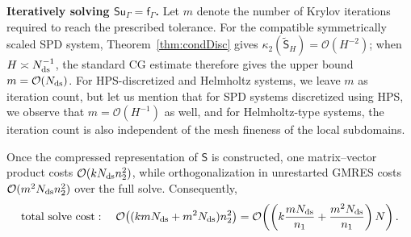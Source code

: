 \documentclass[final,onefignum,onetabnum]{siamart250211}
\newcommand{\vct}[1]{\bm{\mathsf{#1}}}
\newcommand{\mtx}[1]{\bm{\mathsf{#1}}}
\theoremstyle{definition}
\begin{document}
\noindent \textbf{Iteratively solving $\mtx{S}\vct{u}_{\Gamma} = \vct{f}_{\Gamma}$.}
Let $m$ denote the number of Krylov iterations required to reach the prescribed tolerance. For the compatible symmetrically scaled SPD system, Theorem~\ref{thm:condDisc} gives $\kappa_2(\widetilde{\mtx{S}}_H)=\mathcal O(H^{-2})$; when $H\asymp N_{\rm ds}^{-1}$, the standard CG estimate therefore gives the upper bound $m=\mathcal O(N_{\rm ds})$. For HPS-discretized and Helmholtz systems, we leave $m$ as iteration count, but let us mention that for SPD systems discretized using HPS, we observe that $m=\mathcal{O}(H^{-1})$ as well, and for Helmholtz-type systems, the iteration count is also independent of the mesh fineness of the local subdomains.


Once the compressed representation of $\mtx S$ is constructed, one matrix--vector product costs $\mathcal O(kN_{\rm ds}n_2^2)$, while orthogonalization in unrestarted GMRES costs $\mathcal O(m^2N_{\rm ds}n_2^2)$ over the full solve. Consequently,
\[
\text{total solve cost}:\quad
\mathcal O\!\left((k mN_{\rm ds}+m^2N_{\rm ds})n_2^2\right)
=
\mathcal O\!\left(\left(k\frac{mN_{\rm ds}}{n_1}+\frac{m^2N_{\rm ds}}{n_1}\right)N\right).
\]
\end{document}

